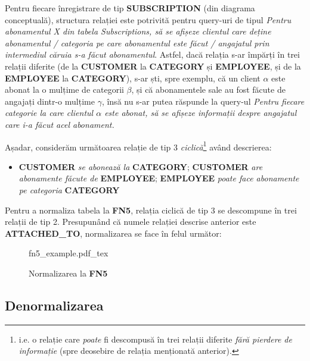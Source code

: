 \documentclass[a4paper, oneside, 12pt]{article}
\newcommand{\incfig}[1]{%
    \def\svgwidth{\columnwidth}
    {#1.pdf_tex}
}
\begin{document}
Pentru fiecare înregistrare de tip \textbf{SUBSCRIPTION} (din diagrama
conceptuală), structura relației este potrivită pentru query-uri de tipul
\emph{Pentru abonamentul X din tabela Subscriptions, să se afișeze clientul
care deține abonamentul / categoria pe care abonamentul este făcut / angajatul
prin intermediul căruia s-a făcut abonamentul}. Astfel, dacă relația s-ar
împărți în trei relații diferite (de la \textbf{CUSTOMER} la \textbf{CATEGORY}
și \textbf{EMPLOYEE}, și de la \textbf{EMPLOYEE} la \textbf{CATEGORY}), s-ar
ști, spre exemplu, că un client $\alpha$ este abonat la o mulțime de categorii
$\beta$, și că abonamentele sale au fost făcute de angajați dintr-o mulțime $\gamma$,
însă nu s-ar putea răspunde la query-ul \emph{Pentru fiecare categorie la care
clientul $\alpha$ este abonat, să se afișeze informații despre angajatul care
i-a făcut acel abonament.}

Așadar, considerăm următoarea relație de tip 3 \emph{ciclică}\footnote{i.e. o
relație care \emph{poate} fi descompusă în trei relații diferite \emph{fără
pierdere de informație} (spre deosebire de relația menționată anterior).} având
descrierea:

\begin{itemize}[label=\textbullet, noitemsep, topsep=0pt, after=]
        \item \textbf{CUSTOMER} \emph{se abonează la} \textbf{CATEGORY};
              \textbf{CUSTOMER} \emph{are abonamente făcute de} \textbf{EMPLOYEE};
              \textbf{EMPLOYEE} \emph{poate face abonamente pe categoria} \textbf{CATEGORY}

\end{itemize}

Pentru a normaliza tabela la \textbf{FN5}, relația ciclică de tip 3 se
descompune în trei relații de tip 2. Presupunând că numele relației descrise
anterior este \textbf{ATTACHED\_TO}, normalizarea se face în felul următor:

\begin{figure}[H]
    \centering
    \incfig{fn5_example}
    \caption{Normalizarea la \textbf{FN5}}
    \label{fig:norm5}
\end{figure}

\subsection{Denormalizarea}
\end{document}
